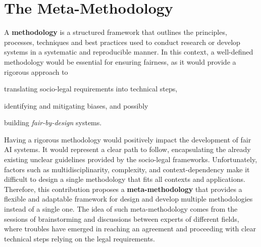 \documentclass[12pt,a4paper,openright,twoside]{book}
\begin{document}



% 


\chapter{The Meta-Methodology}%
\label{chap:meta-methodology}


A \textbf{methodology} is a structured framework that outlines the principles, processes, techniques and best practices used to conduct research or develop systems in a systematic and reproducible manner.
%
In this context, a well-defined methodology would be essential for ensuring fairness, as it would provide a rigorous approach to
\begin{enumerate*}[label=(\roman*)]
    \item translating socio-legal requirements into technical steps,
    \item identifying and mitigating biases, and possibly
    \item building \textit{fair-by-design} systems.
\end{enumerate*}

Having a rigorous methodology would positively impact the development of fair \ac{AI} systems.
%
It would represent a clear path to follow, encapsulating the already existing unclear guidelines provided by the socio-legal frameworks.
Unfortunately, factors such as multidisciplinarity, complexity, and context-dependency make it difficult to design a single methodology that fits all contexts and applications.
%
Therefore, this contribution proposes a \textbf{meta-methodology} that provides a flexible and adaptable framework for design and develop multiple methodologies instead of a single one.
%
The idea of such meta-methodology comes from the sessions of brainstorming and discussions between experts of different fields, where troubles have emerged in reaching an agreement and proceeding with clear technical steps relying on the legal requirements.
\end{document}
